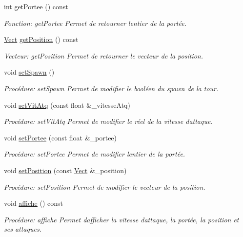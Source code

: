 \begin{DoxyCompactItemize}
int \hyperlink{classTour_a5673a20fed27ffce9d299344dbe87d8d}{get\+Portee} () const
\begin{DoxyCompactList}\small\item\em Fonction\+: get\+Portee Permet de retourner l\textquotesingle{}entier de la portée. \end{DoxyCompactList}\item 
\hyperlink{classVect}{Vect} \hyperlink{classTour_a4645c52ba7bf31afcf6d80f04f382db9}{get\+Position} () const
\begin{DoxyCompactList}\small\item\em Vecteur\+: get\+Position Permet de retourner le vecteur de la position. \end{DoxyCompactList}\item 
void \hyperlink{classTour_ae14b537e1e6fcfef00eadfd0d6d29e46}{set\+Spawn} ()
\begin{DoxyCompactList}\small\item\em Procédure\+: set\+Spawn Permet de modifier le booléen du spawn de la tour. \end{DoxyCompactList}\item 
void \hyperlink{classTour_a110c73fc4160189cdafbb700f3999a39}{set\+Vit\+Atq} (const float \&\+\_\+vitesse\+Atq)
\begin{DoxyCompactList}\small\item\em Procédure\+: set\+Vit\+Atq Permet de modifier le réel de la vitesse d\textquotesingle{}attaque. \end{DoxyCompactList}\item 
void \hyperlink{classTour_a7f9a17a8138ebd8afe72520d7d8a18db}{set\+Portee} (const float \&\+\_\+portee)
\begin{DoxyCompactList}\small\item\em Procédure\+: set\+Portee Permet de modifier l\textquotesingle{}entier de la portée. \end{DoxyCompactList}\item 
void \hyperlink{classTour_a1db07b7ed15a7b0d11e96bb67831feba}{set\+Position} (const \hyperlink{classVect}{Vect} \&\+\_\+position)
\begin{DoxyCompactList}\small\item\em Procédure\+: set\+Position Permet de modifier le vecteur de la position. \end{DoxyCompactList}\item 
void \hyperlink{classTour_abc82d80a3a618ed209fb288cee7c7a4e}{affiche} () const
\begin{DoxyCompactList}\small\item\em Procédure\+: affiche Permet d\textquotesingle{}afficher la vitesse d\textquotesingle{}attaque, la portée, la position et ses attaques. \end{DoxyCompactList}\item 

\end{DoxyCompactItemize}
